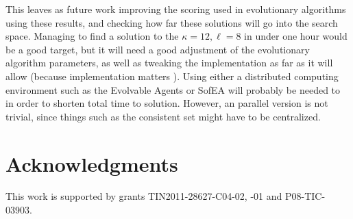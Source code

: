 \documentclass[preprint,12pt]{elsarticle}
\begin{document}
This leaves as future work improving the scoring used in evolutionary
algorithms using these results, and checking how far these solutions
will go into the search space. Managing to find a solution to the
$\kappa=12,\ell=8$ in under one hour would be a good target, but it
will need a good adjustment of the evolutionary algorithm parameters,
as well as tweaking the implementation as far as it will allow
(because implementation matters
\cite{DBLP:conf/iwann/MereloRACML11}). Using either a distributed
computing environment such as the Evolvable Agents \cite{juanlu:SC08}
or SofEA \cite{sofea:naco} will probably be needed to in order to
shorten total time to solution. However, an parallel version is not
trivial, since things such as the consistent set might have to be centralized.

\section*{Acknowledgments}

 This work is supported by grants TIN2011-28627-C04-02, -01 and  P08-TIC-03903.



\end{document}
